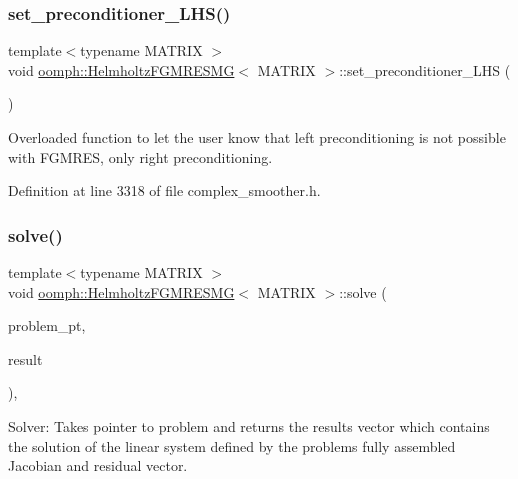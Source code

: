 \subsubsection{\texorpdfstring{set\+\_\+preconditioner\+\_\+\+L\+H\+S()}{set\_preconditioner\_LHS()}}
{\footnotesize\ttfamily template$<$typename M\+A\+T\+R\+IX $>$ \\
void \hyperlink{classoomph_1_1HelmholtzFGMRESMG}{oomph\+::\+Helmholtz\+F\+G\+M\+R\+E\+S\+MG}$<$ M\+A\+T\+R\+IX $>$\+::set\+\_\+preconditioner\+\_\+\+L\+HS (\begin{DoxyParamCaption}{ }\end{DoxyParamCaption})\hspace{0.3cm}{\ttfamily [inline]}}



Overloaded function to let the user know that left preconditioning is not possible with F\+G\+M\+R\+ES, only right preconditioning. 



Definition at line 3318 of file complex\+\_\+smoother.\+h.

\mbox{\label{classoomph_1_1HelmholtzFGMRESMG_a36a1d601676df2ebe39fcdb7a0837864}} 
\subsubsection{\texorpdfstring{solve()}{solve()}}
{\footnotesize\ttfamily template$<$typename M\+A\+T\+R\+IX $>$ \\
void \hyperlink{classoomph_1_1HelmholtzFGMRESMG}{oomph\+::\+Helmholtz\+F\+G\+M\+R\+E\+S\+MG}$<$ M\+A\+T\+R\+IX $>$\+::solve (\begin{DoxyParamCaption}\item[{\hyperlink{classoomph_1_1Problem}{Problem} $\ast$const \&}]{problem\+\_\+pt,  }\item[{\hyperlink{classoomph_1_1DoubleVector}{Double\+Vector} \&}]{result }\end{DoxyParamCaption})\hspace{0.3cm}{\ttfamily [inline]}, {\ttfamily [virtual]}}



Solver\+: Takes pointer to problem and returns the results vector which contains the solution of the linear system defined by the problem\textquotesingle{}s fully assembled Jacobian and residual vector. 



